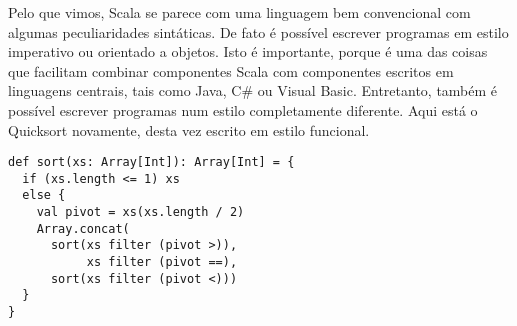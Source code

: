 %
Pelo que vimos, Scala se parece com uma linguagem bem convencional 
com algumas peculiaridades sintáticas. De fato é possível escrever
programas em estilo imperativo ou orientado a objetos. Isto é 
importante, porque é uma das coisas que facilitam combinar componentes
Scala com componentes escritos em linguagens centrais, tais como Java,
C\# ou Visual Basic.
Entretanto, também é possível escrever programas num estilo completamente
diferente. Aqui está o Quicksort novamente, desta vez escrito em 
estilo funcional.
\begin{lstlisting}
def sort(xs: Array[Int]): Array[Int] = {
  if (xs.length <= 1) xs
  else {
    val pivot = xs(xs.length / 2)
    Array.concat(
      sort(xs filter (pivot >)),
           xs filter (pivot ==),
      sort(xs filter (pivot <)))
  }
}
\end{lstlisting}
